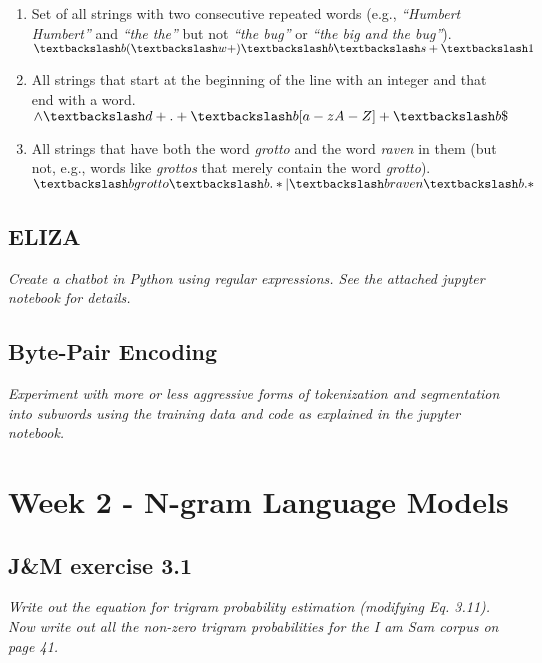 \documentclass[a4paper, 11pt]{article}
\begin{document}
\begin{enumerate}
	\item Set of all strings with two consecutive repeated words (e.g., \textit{“Humbert Humbert”} and \textit{“the the”} but not \textit{“the bug”} or \textit{“the big and the bug”}). \\ $ \textbackslash b(\textbackslash w+)\textbackslash b \textbackslash s+ \textbackslash1 $
	
	\item All strings that start at the beginning of the line with an integer and that end with a word. \\ $ \wedge \textbackslash d+.+ \textbackslash b[a-zA-Z]+\textbackslash b \$ $
	
	\item All strings that have both the word \textit{grotto} and the word \textit{raven} in them (but not, e.g., words like \textit{grottos} that merely contain the word \textit{grotto}). \\ $ \textbackslash b \space { grotto} \textbackslash b.* | \textbackslash b \space { raven} \textbackslash b.*  $
\end{enumerate}

\subsection{ELIZA}

\textit{Create a chatbot in Python using regular expressions. See the attached jupyter notebook for details.}

\subsection{Byte-Pair Encoding}

\textit{Experiment with more or less aggressive forms of tokenization and segmentation into subwords using the training data and code as explained in the jupyter notebook.}

\section{Week 2 - N-gram Language Models}

\subsection{J\&M exercise 3.1}

\textit{Write out the equation for trigram probability estimation (modifying Eq. 3.11). Now write out all the non-zero trigram probabilities for the I am Sam corpus on page 41.}
\end{document}
